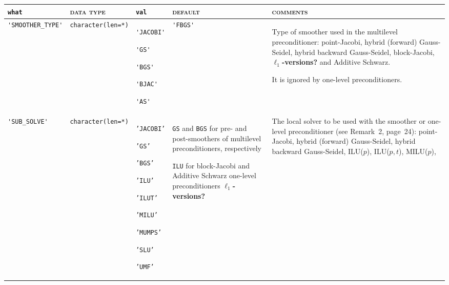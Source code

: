 \bsideways
\begin{center}
\small
\begin{tabular}{|p{3.6cm}|l|p{1.9cm}|p{3.6cm}|p{6.5cm}|}
\hline
\verb|what|              & \textsc{data type}        &  \verb|val|      &  \textsc{default}  &
\textsc{comments} \\ \hline

\verb|'SMOOTHER_TYPE'|  & \verb|character(len=*)|
                         & \verb|'JACOBI'| \par \verb|'GS'| \par \verb|'BGS'| \par \verb|'BJAC'|
                            \par \verb|'AS'|
                         & \verb|'FBGS'|
                         & Type of smoother used in the multilevel preconditioner:
                            point-Jacobi, hybrid (forward) Gauss-Seidel,
			    hybrid backward Gauss-Seidel, block-Jacobi, \textbf{$\ell_1$-versions?} and
                            Additive Schwarz. \par
                            It is ignored by one-level preconditioners. \\ \hline
\verb|'SUB_SOLVE'|  & \verb|character(len=*)|
                         & \texttt{'JACOBI'} \par
                           \texttt{'GS'} \par \texttt{'BGS'} \par \texttt{'ILU'} \par
                           \texttt{'ILUT'} \par \texttt{'MILU'} \par
                           \par \texttt{'MUMPS'} \par \texttt{'SLU'} \par \texttt{'UMF'}
                         & \texttt{GS} and \texttt{BGS} for pre- and post-smoothers
                            of multilevel preconditioners, respectively \par
                            \texttt{ILU} for block-Jacobi and Additive Schwarz
                            one-level preconditioners
			    \textbf{$\ell_1$-versions?}
                         & The local solver to be used with the smoother or one-level
                            preconditioner (see Remark~2, page~24): point-Jacobi,
                            hybrid (forward) Gauss-Seidel, hybrid backward
                           Gauss-Seidel, ILU($p$),  ILU($p,t$), MILU($p$),

\end{tabular}
\end{center}
